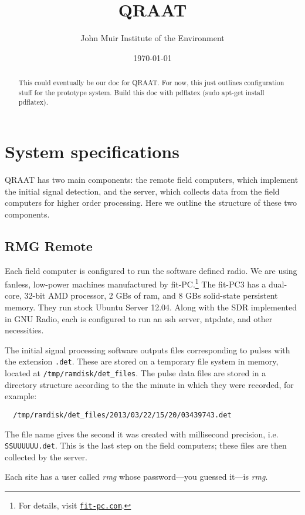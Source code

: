 \documentclass[letter]{article}
\author{John Muir Institute of the Environment}
\date{\today}
\title{QRAAT}
\newcounter{foot}
\begin{document}
\maketitle

\begin{abstract}
This could eventually be our doc for QRAAT. For now, this just outlines configuration 
stuff for the prototype system. Build this doc with pdflatex (sudo apt-get install pdflatex). 
\end{abstract}

\tableofcontents



\section{System specifications}
QRAAT has two main components: the remote field computers, which implement the initial 
signal detection, and the server, which collects data from the field computers for 
higher order processing. Here we outline the structure of these two components. 

\subsection{RMG Remote}
Each field computer is configured to run the software defined radio. We are using 
fanless, low-power machines manufactured by fit-PC.\footnote{For details, visit
\href{http://www.fit-pc.com}{\tt fit-pc.com}.} The fit-PC3 has a dual-core, 32-bit AMD
processor, 2 GBs of ram, and 8 GBs solid-state persistent memory. They 
run stock Ubuntu Server 12.04. Along with the SDR implemented in GNU Radio, each is 
configured to run an ssh server, ntpdate, and other necessities. 

The initial signal processing software outputs files corresponding to pulses 
with the extension \texttt{.det}. These are stored on a temporary file system in memory, 
located at \texttt{/tmp/ramdisk/det\_files}. The pulse data files are stored in a directory 
structure according to the the minute in which they were recorded, for example: 
\begin{verbatim}
  /tmp/ramdisk/det_files/2013/03/22/15/20/03439743.det
\end{verbatim}
The file name gives the second it was created with millisecond precision, i.e. 
\texttt{SSUUUUUU.det}. This is the last step on the field computers; these files are 
then collected by the server. 

Each site has a user called \textit{rmg} whose password---you guessed it---is \textit{rmg}. 
\end{document}
